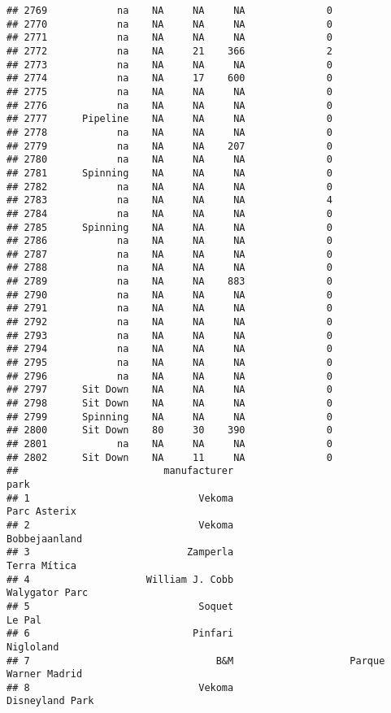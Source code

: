 \documentclass[
]{article}
\begin{document}
\begin{verbatim}
## 2769            na    NA     NA     NA              0
## 2770            na    NA     NA     NA              0
## 2771            na    NA     NA     NA              0
## 2772            na    NA     21    366              2
## 2773            na    NA     NA     NA              0
## 2774            na    NA     17    600              0
## 2775            na    NA     NA     NA              0
## 2776            na    NA     NA     NA              0
## 2777      Pipeline    NA     NA     NA              0
## 2778            na    NA     NA     NA              0
## 2779            na    NA     NA    207              0
## 2780            na    NA     NA     NA              0
## 2781      Spinning    NA     NA     NA              0
## 2782            na    NA     NA     NA              0
## 2783            na    NA     NA     NA              4
## 2784            na    NA     NA     NA              0
## 2785      Spinning    NA     NA     NA              0
## 2786            na    NA     NA     NA              0
## 2787            na    NA     NA     NA              0
## 2788            na    NA     NA     NA              0
## 2789            na    NA     NA    883              0
## 2790            na    NA     NA     NA              0
## 2791            na    NA     NA     NA              0
## 2792            na    NA     NA     NA              0
## 2793            na    NA     NA     NA              0
## 2794            na    NA     NA     NA              0
## 2795            na    NA     NA     NA              0
## 2796            na    NA     NA     NA              0
## 2797      Sit Down    NA     NA     NA              0
## 2798      Sit Down    NA     NA     NA              0
## 2799      Spinning    NA     NA     NA              0
## 2800      Sit Down    80     30    390              0
## 2801            na    NA     NA     NA              0
## 2802      Sit Down    NA     11     NA              0
##                         manufacturer                                    park
## 1                             Vekoma                            Parc Asterix
## 2                             Vekoma                           Bobbejaanland
## 3                           Zamperla                            Terra Mítica
## 4                    William J. Cobb                          Walygator Parc
## 5                             Soquet                                  Le Pal
## 6                            Pinfari                               Nigloland
## 7                                B&M                    Parque Warner Madrid
## 8                             Vekoma                         Disneyland Park

\end{verbatim}
\end{document}
